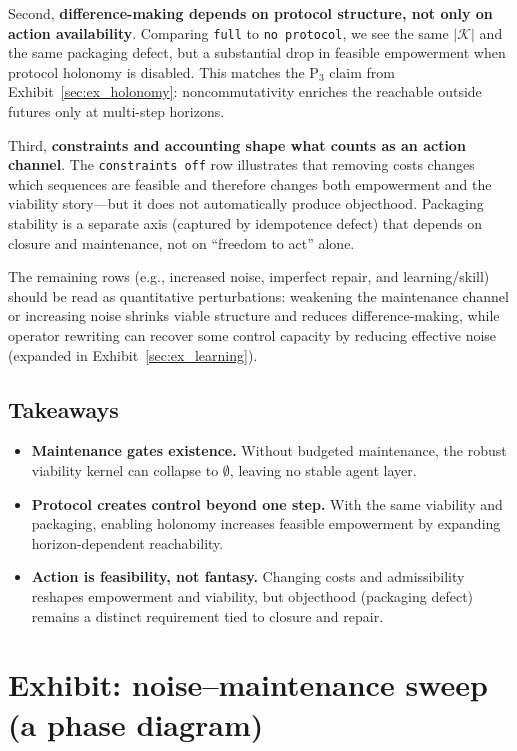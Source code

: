 \documentclass[11pt]{article}
\newcommand{\K}{\mathcal{K}}
\begin{document}
Second, \textbf{difference-making depends on protocol structure, not only on action availability}. Comparing \texttt{full} to \texttt{no protocol}, we see the same $|\K|$ and the same packaging defect, but a substantial drop in feasible empowerment when protocol holonomy is disabled. This matches the P$_3$ claim from Exhibit~\ref{sec:ex_holonomy}: noncommutativity enriches the reachable outside futures only at multi-step horizons.

Third, \textbf{constraints and accounting shape what counts as an action channel}. The \texttt{constraints off} row illustrates that removing costs changes which sequences are feasible and therefore changes both empowerment and the viability story---but it does not automatically produce objecthood. Packaging stability is a separate axis (captured by idempotence defect) that depends on closure and maintenance, not on ``freedom to act'' alone.

The remaining rows (e.g., increased noise, imperfect repair, and learning/skill) should be read as quantitative perturbations: weakening the maintenance channel or increasing noise shrinks viable structure and reduces difference-making, while operator rewriting can recover some control capacity by reducing effective noise (expanded in Exhibit~\ref{sec:ex_learning}).

\subsection*{Takeaways}
\begin{itemize}[leftmargin=*, itemsep=0.25em]
  \item \textbf{Maintenance gates existence.} Without budgeted maintenance, the robust viability kernel can collapse to $\emptyset$, leaving no stable agent layer.
  \item \textbf{Protocol creates control beyond one step.} With the same viability and packaging, enabling holonomy increases feasible empowerment by expanding horizon-dependent reachability.
  \item \textbf{Action is feasibility, not fantasy.} Changing costs and admissibility reshapes empowerment and viability, but objecthood (packaging defect) remains a distinct requirement tied to closure and repair.
\end{itemize}
 \section{Exhibit: noise--maintenance sweep (a phase diagram)}
\label{sec:ex_sweep}
\end{document}
